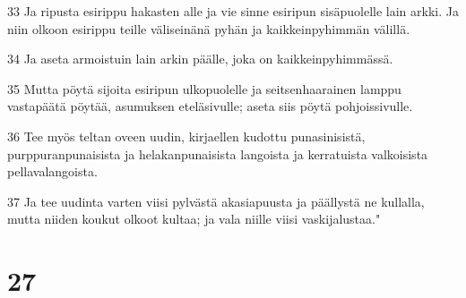 \par 33 Ja ripusta esirippu hakasten alle ja vie sinne esiripun sisäpuolelle lain arkki. Ja niin olkoon esirippu teille väliseinänä pyhän ja kaikkeinpyhimmän välillä.
\par 34 Ja aseta armoistuin lain arkin päälle, joka on kaikkeinpyhimmässä.
\par 35 Mutta pöytä sijoita esiripun ulkopuolelle ja seitsenhaarainen lamppu vastapäätä pöytää, asumuksen eteläsivulle; aseta siis pöytä pohjoissivulle.
\par 36 Tee myös teltan oveen uudin, kirjaellen kudottu punasinisistä, purppuranpunaisista ja helakanpunaisista langoista ja kerratuista valkoisista pellavalangoista.
\par 37 Ja tee uudinta varten viisi pylvästä akasiapuusta ja päällystä ne kullalla, mutta niiden koukut olkoot kultaa; ja vala niille viisi vaskijalustaa."

\chapter{27}

